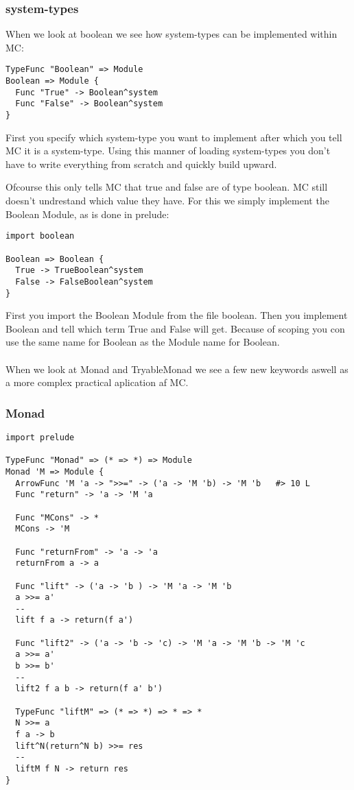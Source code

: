 \subsubsection{system-types}
When we look at boolean we see how system-types can be implemented within MC:
\begin{lstlisting}
TypeFunc "Boolean" => Module
Boolean => Module {
  Func "True" -> Boolean^system
  Func "False" -> Boolean^system
}
\end{lstlisting}

First you specify which system-type you want to implement after which you tell MC it is a system-type.
Using this manner of loading system-types you don't have to write everything from scratch and quickly build upward.

Ofcourse this only tells MC that true and false are of type boolean.
MC still doesn't undrestand which value they have.
For this we simply implement the Boolean Module, as is done in prelude:

\begin{lstlisting}
import boolean

Boolean => Boolean {
  True -> TrueBoolean^system
  False -> FalseBoolean^system
}
\end{lstlisting}

First you import the Boolean Module from the file boolean.
Then you implement Boolean and tell which term True and False will get.
Because of scoping you con use the same name for Boolean as the Module name for Boolean.

\paragraph{} When we look at Monad and TryableMonad we see a few new keywords aswell as a more complex practical aplication af MC.

\subsubsection{Monad}

\begin{lstlisting}
import prelude

TypeFunc "Monad" => (* => *) => Module
Monad 'M => Module {
  ArrowFunc 'M 'a -> ">>=" -> ('a -> 'M 'b) -> 'M 'b   #> 10 L
  Func "return" -> 'a -> 'M 'a

  Func "MCons" -> *
  MCons -> 'M

  Func "returnFrom" -> 'a -> 'a
  returnFrom a -> a

  Func "lift" -> ('a -> 'b ) -> 'M 'a -> 'M 'b
  a >>= a'
  --
  lift f a -> return(f a')

  Func "lift2" -> ('a -> 'b -> 'c) -> 'M 'a -> 'M 'b -> 'M 'c
  a >>= a'
  b >>= b'
  --
  lift2 f a b -> return(f a' b')

  TypeFunc "liftM" => (* => *) => * => *
  N >>= a
  f a -> b
  lift^N(return^N b) >>= res
  --
  liftM f N -> return res
}
\end{lstlisting}

